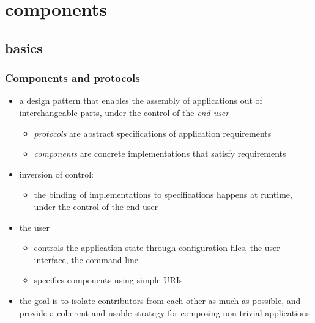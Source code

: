 %
%


\section{components}
\subsection{basics}

\begin{frame}
%
  \frametitle{Components and protocols}
%
  \begin{itemize}
%
    \item a design pattern that enables the assembly of applications out of interchangeable
      parts, under the control of the {\em end user}
      \begin{itemize}
      \item {\em protocols} are abstract specifications of application requirements
      \item {\em components} are concrete implementations that satisfy requirements
      \end{itemize}
%
    \item inversion of control:
      \begin{itemize}
      \item the binding of implementations to specifications happens at runtime, under the
        control of the end user
      \end{itemize}
%
    \item the user 
      \begin{itemize}
      \item controls the application state through configuration files, the user interface, the
        command line
      \item specifies components using simple URIs
      \end{itemize}
%
    \item the goal is to isolate contributors from each other as much as possible, and provide
      a coherent and usable strategy for composing non-trivial applications
%
  \end{itemize}
%
\end{frame}

